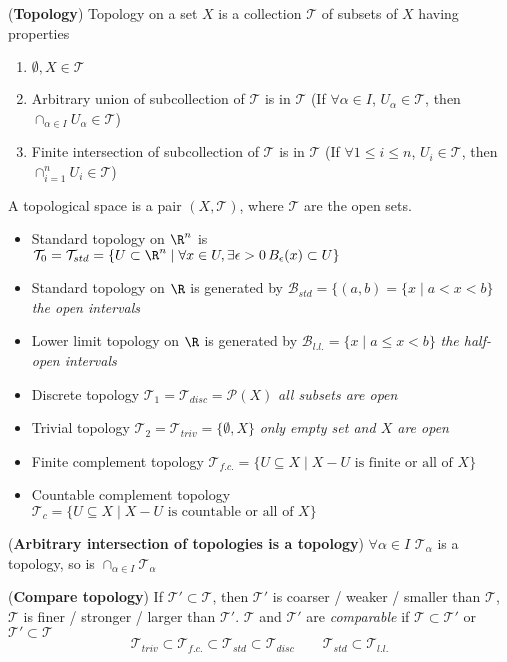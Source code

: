\documentclass[10.5pt]{article}
\newcommand{\calB}{\mathcal{B}}
\newcommand{\calT}{\mathcal{T}}
\newcommand{\calP}{\mathcal{P}}
\begin{document}
\begin{defn*} (\textbf{Topology})
    Topology on a set $X$ is a collection $\calT$ of subsets of $X$ having properties 
    \begin{enumerate}
        \item $\emptyset, X\in \calT$
        \item Arbitrary union of subcollection of $\calT$ is in $\calT$ (If $\forall \alpha \in I$, $U_{\alpha} \in \calT$, then $\cap_{\alpha\in I} U_{\alpha} \in \calT$)
        \item Finite intersection of subcollection of $\calT$ is in $\calT$ (If $\forall 1\leq i \leq n$, $U_i \in \calT$, then $\cap_{i=1}^n U_i \in \calT$)
    \end{enumerate}
    A topological space is a pair $(X,\calT)$, where $\calT$ are the open sets.
    \begin{itemize}
        \item Standard topology on $\R^n$ is $\calT_0 = \calT_{std} = \{U\subset \R^n \mid \forall x\in U, \exists \epsilon > 0 \, B_{\epsilon}(x)\subset U\}$
        \item Standard topology on $\R$ is generated by $\calB_{std} = \{(a,b) = \{x \mid a < x < b \}$ \textit{the open intervals}
        \item Lower limit topology on $\R$ is generated by $\calB_{l.l.} = \{x \mid a \leq x < b\}$ \textit{the half-open intervals}
        \item Discrete topology $\calT_1 = \calT_{disc} = \calP(X)$ \textit{all subsets are open}
        \item Trivial topology $\calT_2 = \calT_{triv} = \{\emptyset, X\}$ \textit{only empty set and $X$ are open}
        \item Finite complement topology $\calT_{f.c.} = \{U\subseteq X \mid X - U \text{ is finite or all of } X\}$
        \item Countable complement topology $\calT_{c} = \{U\subseteq X \mid X - U \text{ is countable or all of } X\}$
    \end{itemize}
\end{defn*}

\begin{lemma*}(\textbf{Arbitrary intersection of topologies is a topology})
    $\forall \alpha \in I$ $\calT_{\alpha}$ is a topology, so is $\cap_{\alpha\in I} \calT_{\alpha}$
\end{lemma*}

\begin{defn*} (\textbf{Compare topology})
    If $\calT' \subset \calT$, then $\calT'$ is coarser / weaker / smaller than $\calT$, $\calT$ is finer / stronger / larger than $\calT'$. $\calT$ and $\calT'$ are \textit{comparable} if $\calT \subset \calT'$ or $\calT' \subset \calT$
    \[
        \calT_{triv} \subset \calT_{f.c.} \subset \calT_{std} \subset \calT_{disc}
        \qquad
        \calT_{std} \subset \calT_{l.l.}
    \]
\end{defn*}
\end{document}

